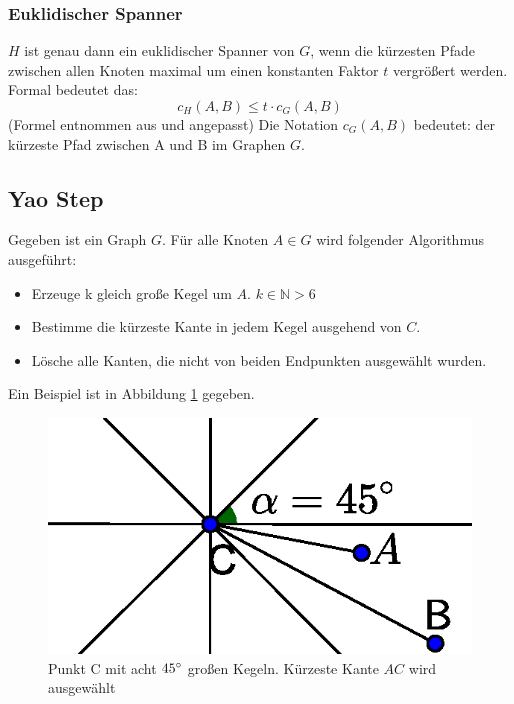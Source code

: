 \documentclass[a4paper,twoside]{IEEEtran}
\begin{document}
\subsubsection{Euklidischer Spanner}
$H $ ist genau dann ein euklidischer Spanner von $G $, wenn die kürzesten Pfade zwischen allen Knoten maximal um einen konstanten Faktor $t $ vergrößert werden.
Formal bedeutet das:
\begin{equation}
	c_H(A, B) \leq t \cdot c_G(A, B)
\end{equation}
{\footnotesize (Formel entnommen aus \cite{kanj} und angepasst)}
Die Notation $c_{G}(A, B) $ bedeutet: der kürzeste Pfad zwischen A und B im Graphen $G $.

\subsection{Yao Step}
Gegeben ist ein Graph $G $. Für alle Knoten $A \in G $ wird folgender Algorithmus ausgeführt:
\begin{itemize}
\item Erzeuge k gleich große Kegel um $A $. $k \in \mathds{N} > 6 $
\item Bestimme die kürzeste Kante in jedem Kegel ausgehend von $C $.
\item Lösche alle Kanten, die nicht von beiden Endpunkten ausgewählt wurden.
\end{itemize}
Ein Beispiel ist in Abbildung \ref{fig:YaoStep2} gegeben.

\begin{figure}
\centering
\includegraphics[width=0.99\linewidth]{Yao_Step2.eps}
\caption{Punkt C mit acht $45\degree $ großen Kegeln. Kürzeste Kante $AC $ wird ausgewählt}
\label{fig:YaoStep2}
\end{figure}


\end{document}

